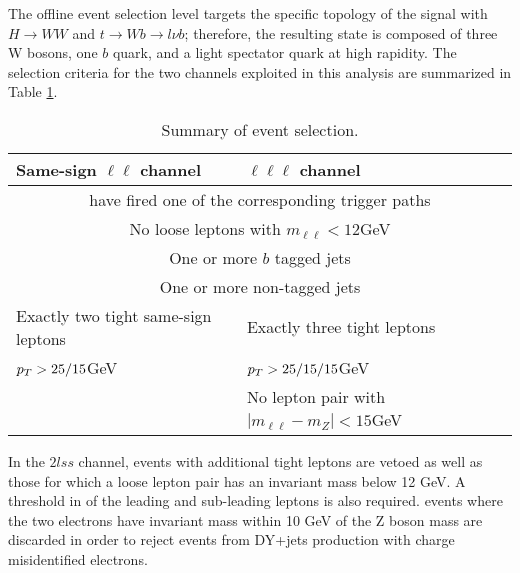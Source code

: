 The offline event selection level targets the specific topology of the \tHq signal with $H\to WW$ and $t \to Wb \to l\nu b$; therefore, the resulting state is composed of three W bosons, one $b$ quark, and a light spectator quark at high rapidity. The selection criteria for the two channels exploited in this analysis are summarized in Table \ref{tab:cuts}.

\begin{table}[!h]
\centering
\begin{tabular}{p{8cm}l} \hline
\textbf{Same-sign $\ell\ell$ channel }           & \textbf{$\ell\ell\ell$ channel}              \\\hline
\multicolumn{2}{c}{have fired one of the corresponding trigger paths}\\
\multicolumn{2}{c}{No loose leptons with $m_{\ell\ell} < 12$GeV} \\
\multicolumn{2}{c}{One or more $b$ tagged jets} \\
\multicolumn{2}{c}{One or more non-tagged jets} \\\hline
Exactly two tight same-sign leptons              & Exactly three tight leptons \\
$p_T>25/15$GeV                                   & $p_T>25/15/15$GeV               \\
                                                 & No lepton pair with $|m_{\ell\ell}-m_Z|<15$GeV \\\hline
\end{tabular}
\caption{Summary of event selection.\label{tab:cuts}}
\end{table}

In the $2lss$ channel, events with additional tight leptons are vetoed as well as those for which a loose lepton pair has an invariant mass below 12 GeV. A threshold in \pt of the leading and sub-leading leptons is also required. events where the two electrons have invariant mass within 10 GeV of the Z boson mass are discarded in order to reject events from DY+jets production with charge misidentified electrons.

